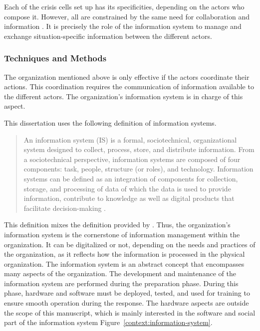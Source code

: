 Each of the crisis cells set up has its specificities, depending on the actors who compose it.
However, all are constrained by the same need for collaboration \parencite{benabenAIFrameworkMetamodel2020,comfortCrisisManagementHindsight2007} and information \parencite{comfortCrisisManagementHindsight2007,endsleyTheorySituationAwareness1995}.
It is precisely the role of the information system to manage and exchange situation-specific information between the different actors.

\subsubsection{Techniques and Methods}
The organization mentioned above is only effective if the actors coordinate their actions.
This coordination requires the communication of information available to the different actors.
The organization's information system is in charge of this aspect.

This dissertation uses the following definition of information systems.
\blockquote{An information system (IS) is a formal, sociotechnical, organizational system designed to collect, process, store, and distribute information.
    From a sociotechnical perspective, information systems are composed of four components: task, people, structure (or roles), and technology.
    Information systems can be defined as an integration of components for collection, storage, and processing of data of which the data is used
    to provide information, contribute to knowledge as well as digital products that facilitate decision-making \parencite{InformationSystem2021}.}
This definition mixes the definition provided by \parencite{oharaManagingThreeLevels1999,piccoliInformationSystemsManagers2019,zwassInformationSystemDefinition}.
Thus, the organization's information system is the cornerstone of information management within the organization.
It can be digitalized or not, depending on the needs and practices of the organization, as it reflects how the information is processed in the physical organization.
The information system is an abstract concept that encompasses many aspects of the organization.
The development and maintenance of the information system are performed during the preparation phase.
During this phase, hardware and software must be deployed, tested, and used for training to ensure smooth operation during the response.
The hardware aspects are outside the scope of this manuscript, which is mainly interested in the software and social part of the information system Figure~\ref{context:information-system}.

